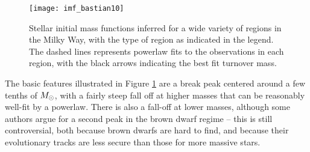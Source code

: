\begin{figure}
\texttt{[image: imf\_bastian10]}
\caption[Measured stellar IMFs in a variety of regions]{
\label{fig:imf_bastian10}
Stellar initial mass functions inferred for a wide variety of regions in the Milky Way, with the type of region as indicated in the legend. The dashed lines represents powerlaw fits to the observations in each region, with the black arrows indicating the best fit turnover mass.
}
\end{figure}

The basic features illustrated in Figure \ref{fig:imf_bastian10} are a break peak centered around a few tenths of $M_{\odot}$, with a fairly steep fall off at higher masses that can be reasonably well-fit by a powerlaw. There is also a fall-off at lower masses, although some authors argue for a second peak in the brown dwarf regime -- this is still controversial, both because brown dwarfs are hard to find, and because their evolutionary tracks are less secure than those for more massive stars.

